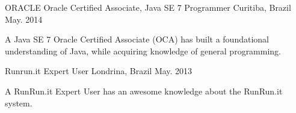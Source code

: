 


\begin{cventries}

  \cventry
    {ORACLE} %
    {Oracle Certified Associate, Java SE 7 Programmer} %
    {Curitiba, Brazil} %
    {May. 2014} %
    {
      \begin{cvitems} %
        \item {A Java SE 7 Oracle Certified Associate (OCA) has built a foundational understanding of Java, while acquiring knowledge of general programming.}
      \end{cvitems}
    }

  \cventry
    {Runrun.it} %
    {Expert User} %
    {Londrina, Brazil} %
    {May. 2013} %
    {
      \begin{cvitems} %
        \item {A RunRun.it Expert User has an awesome knowledge about the RunRun.it system.}
      \end{cvitems}
    }

\end{cventries}
